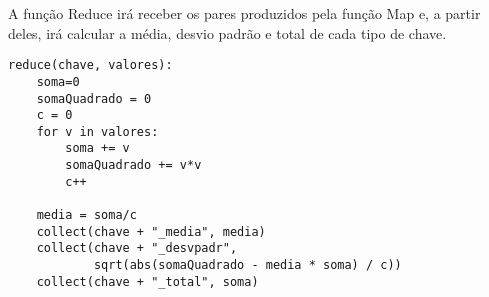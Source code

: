A função Reduce irá receber os pares produzidos pela função Map e, a partir deles, irá
calcular a média, desvio padrão e total de cada tipo de chave.

\begin{verbatim}
reduce(chave, valores):
    soma=0
    somaQuadrado = 0
    c = 0
    for v in valores:
        soma += v
        somaQuadrado += v*v
        c++

    media = soma/c
    collect(chave + "_media", media)
    collect(chave + "_desvpadr",
            sqrt(abs(somaQuadrado - media * soma) / c))
    collect(chave + "_total", soma)
\end{verbatim}


